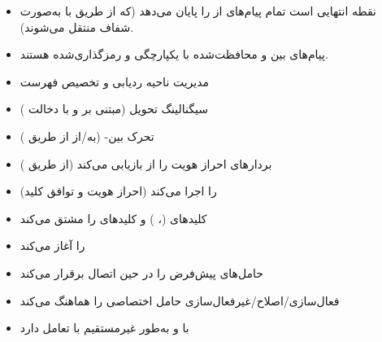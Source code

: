 \CNchained{}

\begin{itemize}
\tightlist
\item
   نقطه انتهایی  است  تمام پیام‌های  از  را پایان می‌دهد (که از طریق  با  به‌صورت شفاف منتقل می‌شوند).
\item
  پیام‌های  بین  و  محافظت‌شده با یکپارچگی و رمزگذاری‌شده هستند.
\end{itemize}


\begin{itemize}
\tightlist
\item
  مدیریت ناحیه ردیابی  و تخصیص فهرست 
\item
  سیگنالینگ تحویل (مبتنی بر  و  با دخالت )
\item
  تحرک بین- (به/\allowbreak{}از  از طریق )
\end{itemize}


\begin{itemize}
\tightlist
\item
  بردارهای احراز هویت را از  بازیابی می‌کند (از طریق )
\item
   (احراز هویت و توافق کلید) را اجرا می‌کند
\item
  کلیدهای  (، ) و کلیدهای  را مشتق می‌کند
\item
   را آغاز می‌کند
\end{itemize}


\begin{itemize}
\tightlist
\item
  حامل‌های پیش‌فرض  را در حین اتصال برقرار می‌کند
\item
  فعال‌سازی/\allowbreak{}اصلاح/\allowbreak{}غیرفعال‌سازی حامل اختصاصی را هماهنگ می‌کند
\item
  با  و به‌طور غیرمستقیم با  تعامل دارد
\end{itemize}

